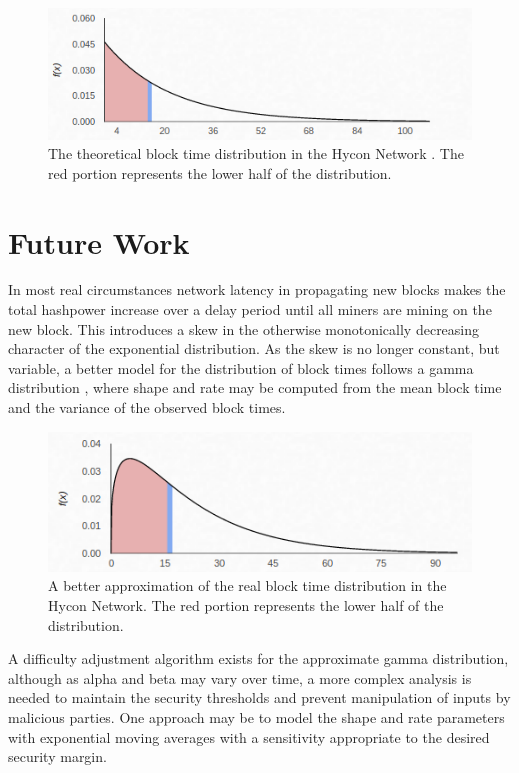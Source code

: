 \documentclass[]{article}
\begin{document}
\begin{figure}[h]
	\centering
	\includegraphics[width=0.7\linewidth]{"./ideal hycon"}
	\caption{\footnotesize The theoretical block time distribution in the Hycon Network \cite{HyconNetwork}. The red portion represents the lower half of the distribution. \cite{GammaDistHycon}}
\end{figure}

\section{Future Work}
In most real circumstances network latency in propagating new blocks makes the total hashpower increase over a delay period until all miners are mining on the new block.  This introduces a skew in the otherwise monotonically decreasing character of the exponential distribution.  As the skew is no longer constant, but variable, a better model for the distribution of block times follows a gamma distribution \cite{GammaDistDefinition}, where shape and rate may be computed from the mean block time and the variance of the observed block times.  

\begin{figure}[h]
	\centering
	\includegraphics[width=0.7\linewidth]{"./real hycon"}
	\caption{\footnotesize A better approximation of the real block time distribution in the Hycon Network. The red portion represents the lower half of the distribution. \cite{GammaDistHycon}}
\end{figure}

A difficulty adjustment algorithm exists for the approximate gamma distribution, although as alpha and beta may vary over time, a more complex analysis is needed to maintain the security thresholds and prevent manipulation of inputs by malicious parties.  One approach may be to model the shape and rate parameters with exponential moving averages with a sensitivity appropriate to the desired security margin.  
\newline
\end{document}
